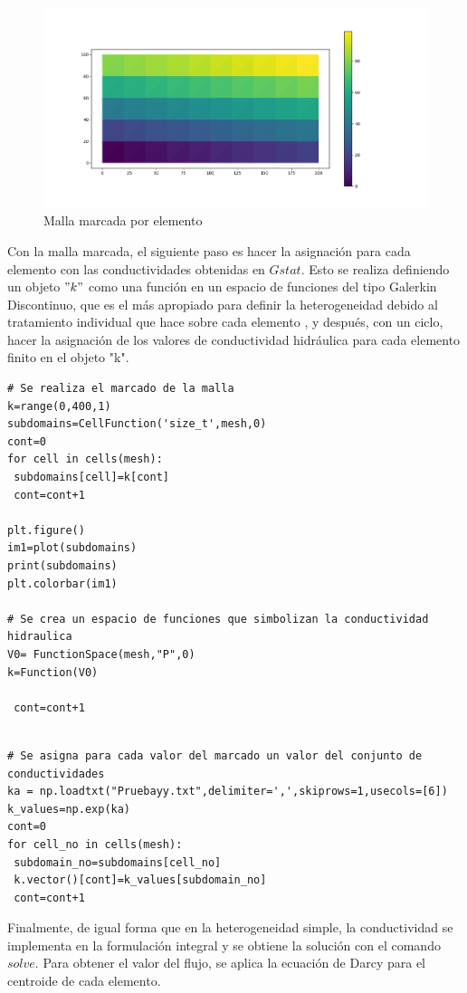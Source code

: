 \begin{figure}[ht!]
\centering
\includegraphics[scale=0.55]{Figura_23.png}
\caption{ Malla marcada por elemento}
\label{Figura20:2}
\end{figure}

Con la malla marcada, el siguiente paso es hacer la asignación para cada elemento con las conductividades obtenidas en $\textit{Gstat}$. Esto se realiza definiendo un objeto $"k"$ como una función en un espacio de funciones del tipo Galerkin Discontinuo, que es el más apropiado para definir la heterogeneidad debido al tratamiento individual que hace sobre cada elemento \cite{Dolejsi2016}, y después, con un ciclo, hacer la asignación de los valores de conductividad hidráulica para cada elemento finito en el objeto "k".

\lstset{language=python,breaklines=true, basicstyle=\footnotesize}
\begin{lstlisting}[frame=single]
# Se realiza el marcado de la malla
k=range(0,400,1)
subdomains=CellFunction('size_t',mesh,0)
cont=0
for cell in cells(mesh):
 subdomains[cell]=k[cont]
 cont=cont+1

plt.figure()
im1=plot(subdomains)
print(subdomains)
plt.colorbar(im1)

# Se crea un espacio de funciones que simbolizan la conductividad hidraulica   
V0= FunctionSpace(mesh,"P",0)
k=Function(V0)

 cont=cont+1
\end{lstlisting}

\lstset{language=python,breaklines=true, basicstyle=\footnotesize}
\begin{lstlisting}[frame=single]

# Se asigna para cada valor del marcado un valor del conjunto de conductividades
ka = np.loadtxt("Pruebayy.txt",delimiter=',',skiprows=1,usecols=[6])
k_values=np.exp(ka)
cont=0
for cell_no in cells(mesh):
 subdomain_no=subdomains[cell_no]
 k.vector()[cont]=k_values[subdomain_no]
 cont=cont+1
\end{lstlisting}



Finalmente, de igual forma que en la  heterogeneidad simple, la conductividad se implementa en la formulación integral y se obtiene la solución con el comando $\textit{solve}$. Para obtener el valor del flujo, se aplica la ecuación de Darcy para el centroide de cada elemento. 



